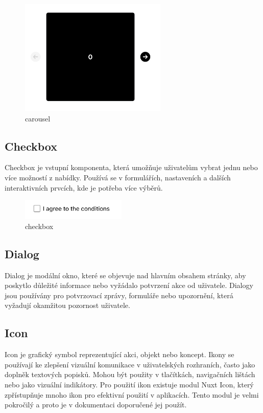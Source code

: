 \begin{figure}[H]
  \centering
  \includegraphics[width=7cm]{images/carousel}
  \captionsetup{justification=centering,margin=2cm}
  \caption{carousel} \label{picture:carousel}
\end{figure}

\subsection{Checkbox}
Checkbox je vstupní komponenta, která umožňuje uživatelům vybrat jednu nebo více možností z nabídky. Používá se v formulářích, nastaveních a dalších interaktivních prvcích, kde je potřeba více výběrů.

\begin{figure}[H]
  \centering
  \includegraphics[width=5cm]{images/checkbox}
  \captionsetup{justification=centering,margin=2cm}
  \caption{checkbox} \label{picture:checkbox}
\end{figure}

\subsection{Dialog}
Dialog je modální okno, které se objevuje nad hlavním obsahem stránky, aby poskytlo důležité informace nebo vyžádalo potvrzení akce od uživatele. Dialogy jsou používány pro potvrzovací zprávy, formuláře nebo upozornění, která vyžadují okamžitou pozornost uživatele.

\subsection{Icon}
Icon je grafický symbol reprezentující akci, objekt nebo koncept. Ikony se používají ke zlepšení vizuální komunikace v uživatelských rozhraních, často jako doplněk textových popisků. Mohou být použity v tlačítkách, navigačních lištách nebo jako vizuální indikátory. Pro použití ikon existuje modul Nuxt Icon, který zpřístupňuje mnoho ikon pro efektivní použití v aplikacích. Tento modul je velmi pokročilý a proto je v dokumentaci doporučené jej použít.

